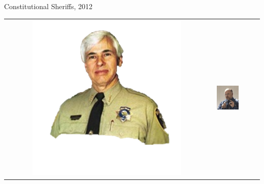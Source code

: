 \begin{frame}{Constitutional Sheriffs, 2012}
\begin{table}[h]
\begin{tabular}{cccc}
    \includegraphics[width=0.75\textwidth,height=.24\textheight,keepaspectratio=true]{img/tony-de-meo.png} &
    \includegraphics[width=0.75\textwidth,height=.24\textheight,keepaspectratio=true]{img/s6.png} &

\end{tabular}
\end{table}
\end{frame}
